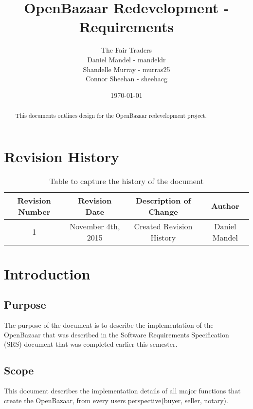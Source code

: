 \documentclass{article}
\begin{document}
\title{OpenBazaar Redevelopment - Requirements}
\author{The Fair Traders \\ Daniel Mandel - mandeldr \\ Shandelle Murray - murras25 \\ Connor Sheehan - sheehacg}
\date{\today}
\maketitle

\begin{abstract}
This documents outlines design for the OpenBazaar redevelopment project.
\end{abstract}

\newpage

\tableofcontents

\section*{Revision History}

\begin{table}[h!]
\centering
\begin{tabular}{||c c c c||}
 \hline
 Revision Number & Revision Date & Description of Change & Author \\ [0.5ex]
 \hline\hline
 1 & November 4th, 2015 & Created Revision History & Daniel Mandel \\ [1ex]
 \hline
\end{tabular}
\caption{Table to capture the history of the document}
\label{table:1}
\end{table}

\section*{Introduction}
\subsection{Purpose}
The purpose of the document is to describe the implementation of the OpenBazaar that was described in the Software Requirements Specification (SRS) document that was completed earlier this semester.

\subsection{Scope}
This document describes the implementation details of all major functions that create the OpenBazaar, from every users perspective(buyer, seller, notary).
\end{document}
